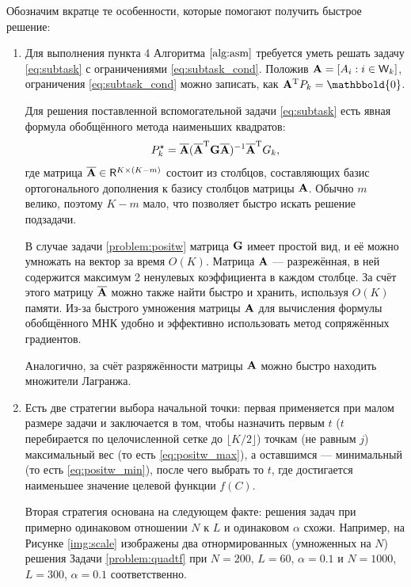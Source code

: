 \documentclass[10pt]{article}
\begin{document}
Обозначим вкратце те особенности, которые помогают получить быстрое решение:
\begin{enumerate}
	\item Для выполнения пункта 4 Алгоритма $\ref{alg:asm}$ требуется уметь решать задачу \eqref{eq:subtask} с ограничениями \eqref{eq:subtask_cond}. Положив $\mathbf{A} = [A_i : i \in \mathsf{W}_k]$, ограничения \eqref{eq:subtask_cond} можно записать, как $\bfA^\rmT P_k = \mathbbold{0}$.
	
	Для решения поставленной вспомогательной задачи \eqref{eq:subtask} есть явная формула обобщённого метода наименьших квадратов:
	\begin{equation*}
	P_k^\star = \overline {\mathbf{A}} (\overline {\mathbf{A}}^{\mathrm{T}} \mathbf{G} \overline {\mathbf{A}})^{-1} \overline {\mathbf{A}}^{\mathrm{T}} G_k,
	\end{equation*}
	где матрица $\overline {\mathbf{A}} \in \mathsf{R}^{K \times (K-m)}$ состоит из столбцов, составляющих базис ортогонального дополнения к базису столбцов матрицы $\mathbf{A}$. Обычно $m$ велико, поэтому $K-m$ мало, что позволяет быстро искать решение подзадачи.
	
	В случае задачи \ref{problem:positw} матрица $\mathbf{G}$ имеет простой вид, и её можно умножать на вектор за время $O(K)$. Матрица $\mathbf{A}$ --- разрежённая, в ней содержится максимум 2 ненулевых коэффициента в каждом столбце. За счёт этого матрицу $\overline {\mathbf{A}}$ можно также найти быстро и хранить, используя $O(K)$ памяти. Из-за быстрого умножения матрицы $\mathbf{A}$ для вычисления формулы обобщённого МНК удобно и эффективно использовать метод сопряжённых градиентов.
	
	Аналогично, за счёт разряжённости матрицы $\mathbf{A}$ можно быстро находить множители Лагранжа.
	
	\item Есть две стратегии выбора начальной точки: первая применяется при малом размере задачи и заключается в том, чтобы назначить первым $t$ ($t$ перебирается по целочисленной сетке до $\lfloor K/2 \rfloor$) точкам (не равным $j$) максимальный вес (то есть \eqref{eq:positw_max}), а оставшимся --- минимальный (то есть \eqref{eq:positw_min}), после чего выбрать то $t$, где достигается наименьшее значение целевой функции $f(C)$.
	
	Вторая стратегия основана на следующем факте: решения задач при примерно одинаковом отношении $N$ к $L$ и одинаковом $\alpha$ схожи. Например, на Рисунке \ref{img:scale} изображены два отнормированных (умноженных на $N$) решения Задачи \ref{problem:quadtf} при $N = 200$, $L = 60$, $\alpha = 0.1$ и $N = 1000$, $L = 300$, $\alpha = 0.1$ соответственно.
	

\end{enumerate}
\end{document}
